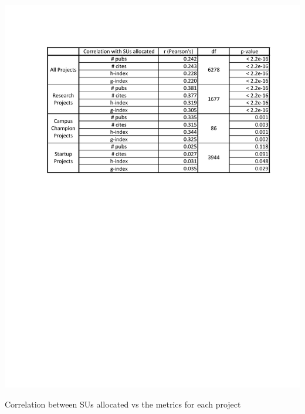 \documentclass{sig-alternate}
\begin{document}
 
 
\begin{table}[htb] 
  \centering 
    \includegraphics[width=1.0\columnwidth]{images/metrics_alloc_r.pdf} 
  \caption{Correlation between SUs allocated vs the metrics for each project}\label{F:metrics-alloc-r} 
\end{table} 
 
\end{document}
